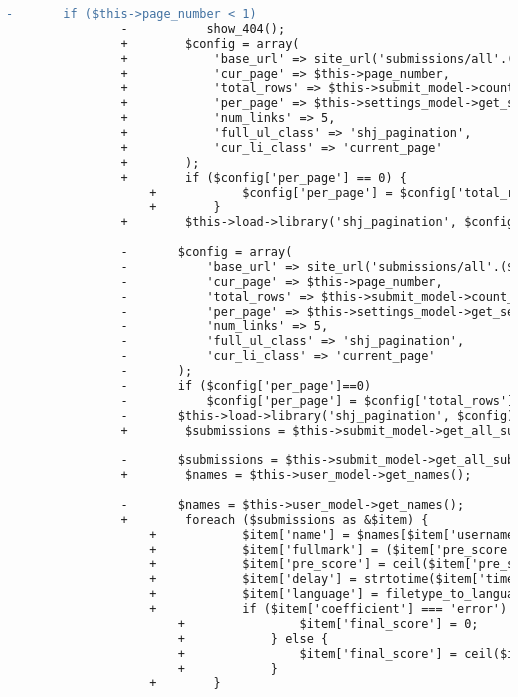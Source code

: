 \begin{lstlisting}[language=diff, caption=Perubahan pada kode Submissions.php]
				-		if ($this->page_number < 1)
				-			show_404();
				+        $config = array(
				+            'base_url' => site_url('submissions/all'.($this->filter_user ? '/user/'.$this->filter_user : '').($this->filter_problem ? '/problem/'.$this->filter_problem : '')),
				+            'cur_page' => $this->page_number,
				+            'total_rows' => $this->submit_model->count_all_submissions($this->user->selected_assignment['id'], $this->user->level, $this->user->username, $this->filter_user, $this->filter_problem),
				+            'per_page' => $this->settings_model->get_setting('results_per_page_all'),
				+            'num_links' => 5,
				+            'full_ul_class' => 'shj_pagination',
				+            'cur_li_class' => 'current_page'
				+        );
				+        if ($config['per_page'] == 0) {
					+            $config['per_page'] = $config['total_rows'];
					+        }
				+        $this->load->library('shj_pagination', $config);
				
				-		$config = array(
				-			'base_url' => site_url('submissions/all'.($this->filter_user?'/user/'.$this->filter_user:'').($this->filter_problem?'/problem/'.$this->filter_problem:'')),
				-			'cur_page' => $this->page_number,
				-			'total_rows' => $this->submit_model->count_all_submissions($this->user->selected_assignment['id'], $this->user->level, $this->user->username, $this->filter_user, $this->filter_problem),
				-			'per_page' => $this->settings_model->get_setting('results_per_page_all'),
				-			'num_links' => 5,
				-			'full_ul_class' => 'shj_pagination',
				-			'cur_li_class' => 'current_page'
				-		);
				-		if ($config['per_page']==0)
				-			$config['per_page'] = $config['total_rows'];
				-		$this->load->library('shj_pagination', $config);
				+        $submissions = $this->submit_model->get_all_submissions($this->user->selected_assignment['id'], $this->user->level, $this->user->username, $this->page_number, $this->filter_user, $this->filter_problem);
				
				-		$submissions = $this->submit_model->get_all_submissions($this->user->selected_assignment['id'], $this->user->level, $this->user->username, $this->page_number, $this->filter_user, $this->filter_problem);
				+        $names = $this->user_model->get_names();
				
				-		$names = $this->user_model->get_names();
				+        foreach ($submissions as &$item) {
					+            $item['name'] = $names[$item['username']];
					+            $item['fullmark'] = ($item['pre_score'] == 10000);
					+            $item['pre_score'] = ceil($item['pre_score'] * $this->problems[$item['problem']]['score'] / 10000);
					+            $item['delay'] = strtotime($item['time']) - strtotime($this->user->selected_assignment['finish_time']);
					+            $item['language'] = filetype_to_language($item['file_type']);
					+            if ($item['coefficient'] === 'error') {
						+                $item['final_score'] = 0;
						+            } else {
						+                $item['final_score'] = ceil($item['pre_score'] * $item['coefficient'] / 100);
						+            }
					+        }
				

\end{lstlisting}
